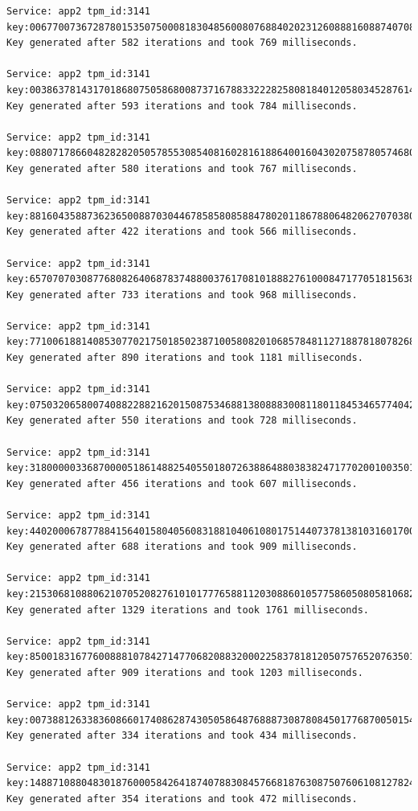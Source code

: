 \begin{lstlisting}
Service: app2 tpm_id:3141 key:006770073672878015350750008183048560080768840202312608881608874070885067
Key generated after 582 iterations and took 769 milliseconds.

Service: app2 tpm_id:3141 key:003863781431701868075058680087371678833222825808184012058034528761407028
Key generated after 593 iterations and took 784 milliseconds.

Service: app2 tpm_id:3141 key:088071786604828282050578553085408160281618864001604302075878057468086488
Key generated after 580 iterations and took 767 milliseconds.

Service: app2 tpm_id:3141 key:881604358873623650088703044678585808588478020118678806482062707038007883
Key generated after 422 iterations and took 566 milliseconds.

Service: app2 tpm_id:3141 key:657070703087768082640687837488003761708101888276100084717705181563810850
Key generated after 733 iterations and took 968 milliseconds.

Service: app2 tpm_id:3141 key:771006188140853077021750185023871005808201068578481127188781807826871150
Key generated after 890 iterations and took 1181 milliseconds.

Service: app2 tpm_id:3141 key:075032065800740882288216201508753468813808883008118011845346577404280885
Key generated after 550 iterations and took 728 milliseconds.

Service: app2 tpm_id:3141 key:318000003368700005186148825405501807263886488038382471770200100350107835
Key generated after 456 iterations and took 607 milliseconds.

Service: app2 tpm_id:3141 key:440200067877884156401580405608318810406108017514407378138103160170083672
Key generated after 688 iterations and took 909 milliseconds.

Service: app2 tpm_id:3141 key:215306810880621070520827610101777658811203088601057758605080581068280106
Key generated after 1329 iterations and took 1761 milliseconds.

Service: app2 tpm_id:3141 key:850018316776008881078427147706820883200022583781812050757652076350150162
Key generated after 909 iterations and took 1203 milliseconds.

Service: app2 tpm_id:3141 key:007388126338360866017408628743050586487688873087808450177687005015401188
Key generated after 334 iterations and took 434 milliseconds.

Service: app2 tpm_id:3141 key:148871088048301876000584264187407883084576681876308750760610812782407365
Key generated after 354 iterations and took 472 milliseconds.


\end{lstlisting}
